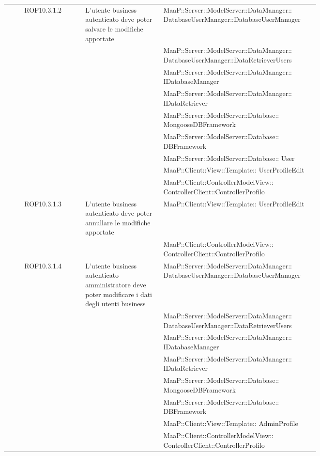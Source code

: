 \begin{center}
\begin{longtable}{|c|p{0.25\linewidth}|p{0.5\linewidth}|}
\midrule
ROF10.3.1.2
& L'utente business autenticato deve poter  salvare le modifiche apportate
& MaaP::Server::ModelServer::DataManager:: DatabaseUserManager::DatabaseUserManager\\
& & MaaP::Server::ModelServer::DataManager:: DatabaseUserManager::DataRetrieverUsers\\
& & MaaP::Server::ModelServer::DataManager:: IDatabaseManager\\
& & MaaP::Server::ModelServer::DataManager:: IDataRetriever\\
& & MaaP::Server::ModelServer::Database:: MongooseDBFramework\\
& & MaaP::Server::ModelServer::Database:: DBFramework\\
& & MaaP::Server::ModelServer::Database:: User\\
& & MaaP::Client::View::Template:: UserProfileEdit\\
& & MaaP::Client::ControllerModelView:: ControllerClient::ControllerProfilo\\

\midrule
ROF10.3.1.3
& L'utente business autenticato deve poter annullare le modifiche apportate
& MaaP::Client::View::Template:: UserProfileEdit\\
& & MaaP::Client::ControllerModelView:: ControllerClient::ControllerProfilo\\

\midrule
ROF10.3.1.4
& L'utente business autenticato amministratore deve poter modificare i dati degli utenti business
& MaaP::Server::ModelServer::DataManager:: DatabaseUserManager::DatabaseUserManager\\
& & MaaP::Server::ModelServer::DataManager:: DatabaseUserManager::DataRetrieverUsers\\
& & MaaP::Server::ModelServer::DataManager:: IDatabaseManager\\
& & MaaP::Server::ModelServer::DataManager:: IDataRetriever\\
& & MaaP::Server::ModelServer::Database:: MongooseDBFramework\\
& & MaaP::Server::ModelServer::Database:: DBFramework\\
& & MaaP::Client::View::Template:: AdminProfile\\
& & MaaP::Client::ControllerModelView:: ControllerClient::ControllerProfilo\\


\end{longtable}
\end{center}
